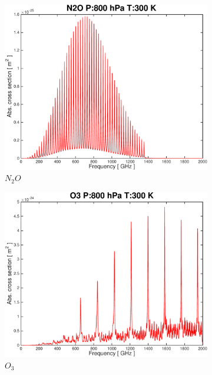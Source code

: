 \documentclass[paper=a4, fontsize=11pt]{scrartcl}
\begin{document}
\begin{figure}[t!]
\begin{subfigure}[b]{0.45\textwidth}
        \includegraphics[width=\textwidth]{plots/plot_xsec_N2O_800hPa_300K.pdf}
        \caption{$N_2O$}
    \end{subfigure}
    \begin{subfigure}[b]{0.45\textwidth}
        \includegraphics[width=\textwidth]{plots/plot_xsec_O3_800hPa_300K.pdf}
        \caption{$O_3$}
    \end{subfigure}
    \begin{subfigure}[b]{0.45\textwidth}

\end{subfigure}
\end{figure}
\end{document}
